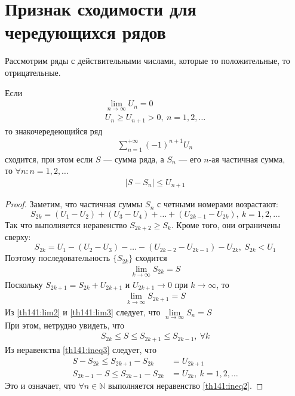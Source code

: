 \section{Признак сходимости для чередующихся рядов}
Рассмотрим ряды с действительными числами, которые то положительные, то
отрицательные.

\begin{theorem}[Лейбница]
  Если
  \begin{gather}
    \lim\limits_{n \to \infty} U_n = 0 \label{th141:lim1} \\
    U_n \geq U_{n+1} > 0, \ n = 1, 2, \dots \label{th141:ineq1}
  \end{gather}
  то знакочередеющийся ряд
  \begin{gather}
    \sum\limits_{n = 1}^{+\infty} {(-1)}^{n+1} U_n \label{th141:sum1}
  \end{gather}
  сходится, при этом если $S$ --- сумма ряда, а $S_n$ --- его $n$-ая частичная
  сумма,\\ то $\forall n: n = 1, 2, \dots$
  \begin{gather}
    |S - S_n| \leq U_{n+1} \label{th141:ineq2}
  \end{gather}
\end{theorem}

\begin{proof}
  Заметим, что частичная суммы $S_n$ с четными номерами возрастают:
  $$S_{2k} = (U_1 - U_2) + (U_3 - U_4) + \dots + (U_{2k - 1} - U_{2k}), \
  k = 1, 2, \dots $$
  Так что выполняется неравенство $S_{2k + 2} \geq S_k$. Кроме того, они
  ограничены сверху:
  $$S_{2k} = U_1 - (U_2 - U_3) - \dots - (U_{2k - 2} - U_{2k - 1}) - U_{2k}, \
  S_{2k} < U_1$$
  Поэтому последовательность $\{S_{2k}\}$ сходится
  \begin{gather}
    \lim\limits_{k \to \infty} S_{2k} = S \label{th141:lim2}
  \end{gather}
  Поскольку $S_{2k + 1} = S_{2k} + U_{2k + 1}$ и $U_{2k + 1} \to 0$ при
  $k \to \infty$, то
  \begin{gather}
    \lim\limits_{k \to \infty} S_{2k + 1} = S \label{th141:lim3}
  \end{gather}
  Из \ref{th141:lim2} и \ref{th141:lim3} следует, что
  $\lim\limits_{n \to \infty} S_n = S$ \\
  При этом, нетрудно увидеть, что
  \begin{gather}
    S_{2k} \leq S \leq S_{2k + 1} \leq S_{2k - 1}, \ \forall k \label{th141:ineq3}
  \end{gather}
  Из неравенства \ref{th141:ineq3} следует, что
  \begin{align*}
    S - S_{2k} \leq S_{2k + 1} - S_{2k} &= U_{2k + 1} \\
    S_{2k - 1} - S \leq S_{2k - 1} - S_{2k} &= U_{2k}, \ k = 1, 2, \dots
  \end{align*}
  Это и означает, что $\forall n \in \mathbb{N}$ выполняется
  неравенство \ref{th141:ineq2}.
\end{proof}

